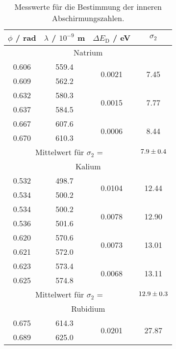 \begin{table}[H]
  \centering
  \begin{tabular}{c|c|c|c}
    \hline
    $\phi$ / rad & $\lambda$ / $10^{-9}$ m & $\Delta E_\text{D}$ / eV & $\sigma_2$ \\
    \hline
    \multicolumn{4}{c}{Natrium} \\
    \hline
    0.606 & 559.4 & \multirow{2}{*}{0.0021} & \multirow{2}{*}{7.45} \\
    0.609 & 562.2 & & \\
    \hline
    0.632 & 580.3 & \multirow{2}{*}{0.0015} & \multirow{2}{*}{7.77} \\
    0.637 & 584.5 & & \\
    \hline
    0.667 & 607.6 & \multirow{2}{*}{0.0006} & \multirow{2}{*}{8.44} \\
    0.670 & 610.3 & & \\
    \hline
    \multicolumn{3}{c}{Mittelwert für $\sigma_2$ =} & $\num{7.9 +- 0.4}$ \\
    \hline
    \multicolumn{4}{c}{Kalium} \\
    \hline
    0.532 & 498.7 & \multirow{2}{*}{0.0104} & \multirow{2}{*}{12.44} \\
    0.534 & 500.2 & & \\
    \hline
    0.534 & 500.2 & \multirow{2}{*}{0.0078} & \multirow{2}{*}{12.90} \\
    0.536 & 501.6 & & \\
    \hline
    0.620 & 570.6 & \multirow{2}{*}{0.0073} & \multirow{2}{*}{13.01} \\
    0.621 & 572.0 & & \\
    \hline
    0.623 & 573.4 & \multirow{2}{*}{0.0068} & \multirow{2}{*}{13.11} \\
    0.625 & 574.8 & & \\
    \hline
    \multicolumn{3}{c}{Mittelwert für $\sigma_2$ =} & $\num{12.9 +- 0.3}$ \\
    \hline
    \multicolumn{4}{c}{Rubidium} \\
    \hline
    0.675 & 614.3 & \multirow{2}{*}{0.0201} & \multirow{2}{*}{27.87} \\
    0.689 & 625.0 & & \\
    \hline
  \end{tabular}
  \caption{Messwerte für die Bestimmung der inneren Abschirmungszahlen.}
  \label{tab:Mess3}
\end{table}
